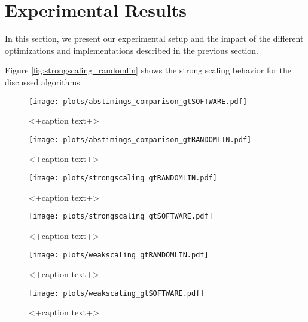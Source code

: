 \section{Experimental Results}\label{sec:exp}
%
In this section, we present our experimental setup and the impact of the different optimizations and implementations described in the previous section.
\par\medskip
%
Figure \ref{fig:strongscaling_randomlin} shows the strong scaling behavior for the discussed algorithms.


\begin{figure}[ht]
	\centering
	\texttt{[image: plots/abstimings\_comparison\_gtSOFTWARE.pdf]}
	\caption{<+caption text+>}
	\label{fig:<+label+>}
\end{figure}
\begin{figure}[ht]
	\centering
	\texttt{[image: plots/abstimings\_comparison\_gtRANDOMLIN.pdf]}
	\caption{<+caption text+>}
	\label{fig:<+label+>}
\end{figure}
\begin{figure}[ht]
	\centering
	\texttt{[image: plots/strongscaling\_gtRANDOMLIN.pdf]}
	\caption{<+caption text+>}
	\label{fig:strongscaling_gtrandom}
\end{figure}
\begin{figure}[ht]
	\centering
	\texttt{[image: plots/strongscaling\_gtSOFTWARE.pdf]}
	\caption{<+caption text+>}
	\label{fig:strongscaling_gtsoftware}
\end{figure}
\begin{figure}[ht]
	\centering
	\texttt{[image: plots/weakscaling\_gtRANDOMLIN.pdf]}
	\caption{<+caption text+>}
	\label{fig:<+label+>}
\end{figure}
\begin{figure}[ht]
	\centering
	\texttt{[image: plots/weakscaling\_gtSOFTWARE.pdf]}
	\caption{<+caption text+>}
	\label{fig:<+label+>}
\end{figure}

